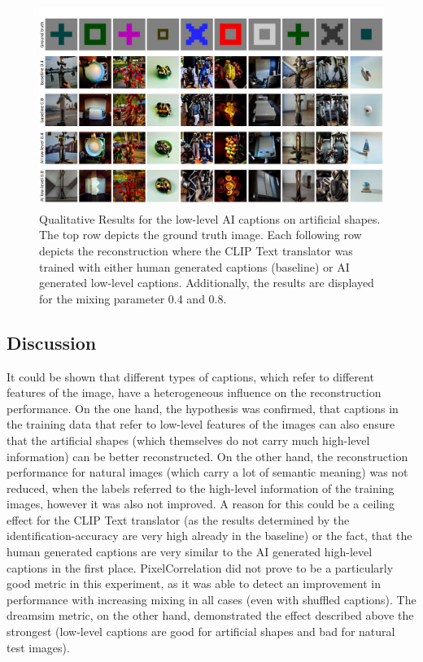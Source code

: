 \begin{figure}[ht]
    \centering
    \includegraphics[width=1\textwidth]{plots/aicap_qual_art.JPEG}
    \caption[Experiment 2: Reconstructed images for artificial shapes]{Qualitative Results for the low-level AI captions on artificial shapes. The top row depicts the ground truth image. Each following row depicts the reconstruction where the CLIP Text translator was trained with either human generated captions (baseline) or AI generated low-level captions. Additionally, the results are displayed for the mixing parameter 0.4 and 0.8.}\label{fig:aicap_qual_art}
\end{figure}

\subsection{Discussion}

It could be shown that different types of captions, which refer to different features of the image, have a heterogeneous influence on the reconstruction performance. On the one hand, the hypothesis was confirmed, that captions in the training data that refer to low-level features of the images can also ensure that the artificial shapes (which themselves do not carry much high-level information) can be better reconstructed. On the other hand, the reconstruction performance for natural images (which carry a lot of semantic meaning) was not reduced,  when the labels referred to the high-level information of the training images, however it was also not improved. A reason for this could be a ceiling effect for the CLIP Text translator (as the results determined by the identification-accuracy are very high already in the baseline) or the fact, that the human generated captions are very similar to the AI generated high-level captions in the first place. PixelCorrelation did not prove to be a particularly good metric in this experiment, as it was able to detect an improvement in performance with increasing mixing in all cases (even with shuffled captions). The dreamsim metric, on the other hand,  demonstrated the effect described above the strongest (low-level captions are good for artificial shapes and bad for natural test images). 

